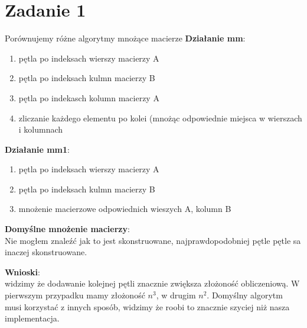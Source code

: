 \section{Zadanie 1}
Porównujemy różne algorytmy mnożące macierze 
\textbf{Działanie mm}:
\begin{enumerate}
    \item pętla po indeksach wierszy macierzy A
    \item pętla po indeksach kulmn macierzy B
    \item pętla po indekasch kolumn macierzy A 
    \item zliczanie każdego elementu po kolei (mnożąc odpowiednie miejsca w wierszach i kolumnach
\end{enumerate}
\textbf{Działanie mm1}:
\begin{enumerate}
    \item pętla po indeksach wierszy macierzy A
    \item pętla po indeksach kulmn macierzy B
    \item mnożenie macierzowe odpowiednich wieszych A, kolumn B
\end{enumerate}
\textbf{Domyślne mnożenie macierzy}:\\
Nie mogłem znaleźć jak to jest skonstruowane, najprawdopodobniej pętle pętle sa inaczej skonstruowane.\\

\begin{center}
\end{center}


\noindent 
\textbf{Wnioski}:\\ widzimy że dodawanie kolejnej pętli znacznie zwiększa złożoność obliczeniową. W pierwszym przypadku mamy złożoność $n^3$, w drugim $n^2$. Domyślny algorytm musi korzystać z innych sposób, widzimy że roobi to znacznie szyciej niż nasza implementacja. 